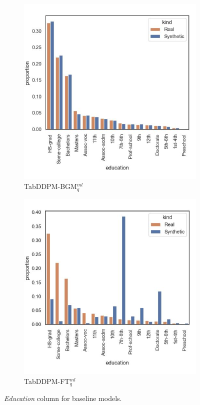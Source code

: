 \begin{figure}[H]
	\begin{subfigure}{0.3\textwidth}
		\centering
		\includegraphics[width=\textwidth]{images/dist_education/tab-ddpm-bgm.jpg}
		\caption{TabDDPM-BGM$^{ml}_q$}
	\end{subfigure}
	\begin{subfigure}{0.3\textwidth}
		\centering
		\includegraphics[width=\textwidth]{images/dist_education/tab-ddpm-ft.jpg}
		\caption{TabDDPM-FT$^{ml}_q$}
	\end{subfigure}
	\caption[Distribution Plots Categorical]{\textit{Education} column for baseline models.}
	\label{fig:education}
\end{figure}

